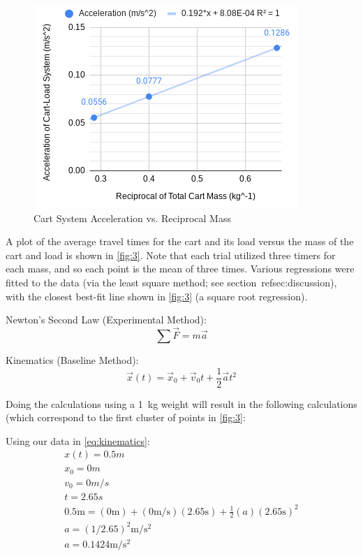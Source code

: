 \documentclass[reprint,amsmath,amssymb,aps,twoside]{revtex4-2}
\begin{document}
\begin{figure}
\begin{center}
\includegraphics[width=\columnwidth]{Acceleration vs. Reciprocal Mass.png}
\end{center}
\caption{Cart System Acceleration vs. Reciprocal Mass}
\label{fig:4sqrootfit}
\end{figure}

A plot of the average travel times for the cart and its load versus the mass of the cart and load is shown in \cref{fig:3}. Note that each trial utilized three timers for each mass, and so each point is the mean of three times. Various regressions were fitted to the data (via the least square method; see section~ref{sec:discussion}), with the closest best-fit line shown in \cref{fig:3} (a square root regression).

Newton's Second Law (Experimental Method): 
\begin{equation} 
    \sum\vec{F} = m\vec{a}
    \label{eq:dynamics}
\end{equation}

 Kinematics (Baseline Method): 
\begin{equation} 
    \vec{x}(t) = \vec{x}_0 + \vec{v}_0t + \frac{1}{2}\vec{a} t^2
    \label{eq:kinematics}
\end{equation}

Doing the calculations using a \qty{1}{\kilo\gram} weight will result in the following calculations (which correspond to the first cluster of points in \cref{fig:3}:

Using our data in \cref{eq:kinematics}: 
\begin{gather*}
    x(t) = 0.5m
    \\x_0 = 0m
    \\v_0 = 0m/s
    \\t = 2.65s
    \\0.5\text{m} = (0\text{m}) + (0\text{m/s})(2.65\text{s})+\frac{1}{2}(a)(2.65\text{s})^2
    \\a = (1/2.65)^2\text{m}/\text{s}^2
    \\a = 0.1424\text{m}/\text{s}^2
\end{gather*}
\end{document}
